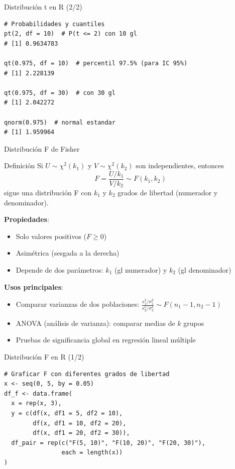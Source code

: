 \documentclass[aspectratio=169, 11pt]{beamer}
\begin{document}
\begin{frame}[fragile]{Distribución t en R (2/2)}
\begin{lstlisting}
# Probabilidades y cuantiles
pt(2, df = 10)  # P(t <= 2) con 10 gl
# [1] 0.9634783

qt(0.975, df = 10)  # percentil 97.5% (para IC 95%)
# [1] 2.228139

qt(0.975, df = 30)  # con 30 gl
# [1] 2.042272

qnorm(0.975)  # normal estandar
# [1] 1.959964
\end{lstlisting}
\end{frame}

\begin{frame}{Distribución F de Fisher}
\begin{block}{Definición}
Si $U \sim \chi^2(k_1)$ y $V \sim \chi^2(k_2)$ son independientes, entonces
\[
F = \frac{U/k_1}{V/k_2} \sim F(k_1, k_2)
\]
sigue una distribución F con $k_1$ y $k_2$ grados de libertad (numerador y denominador).
\end{block}

\textbf{Propiedades}:
\begin{itemize}
\item Solo valores positivos ($F \geq 0$)
\item Asim\'etrica (sesgada a la derecha)
\item Depende de dos par\'ametros: $k_1$ (gl numerador) y $k_2$ (gl denominador)
\end{itemize}

\vspace{-0.3em}
\textbf{Usos principales}:
\begin{itemize}
\item Comparar varianzas de dos poblaciones: $\frac{s_1^2/\sigma_1^2}{s_2^2/\sigma_2^2} \sim F(n_1-1, n_2-1)$
\item ANOVA (análisis de varianza): comparar medias de $k$ grupos
\item Pruebas de significancia global en regresión lineal múltiple
\end{itemize}
\end{frame}

\begin{frame}[fragile]{Distribución F en R (1/2)}
\begin{lstlisting}
# Graficar F con diferentes grados de libertad
x <- seq(0, 5, by = 0.05)
df_f <- data.frame(
  x = rep(x, 3),
  y = c(df(x, df1 = 5, df2 = 10),
        df(x, df1 = 10, df2 = 20),
        df(x, df1 = 20, df2 = 30)),
  df_pair = rep(c("F(5, 10)", "F(10, 20)", "F(20, 30)"),
                each = length(x))
)
\end{lstlisting}
\end{frame}
\end{document}
